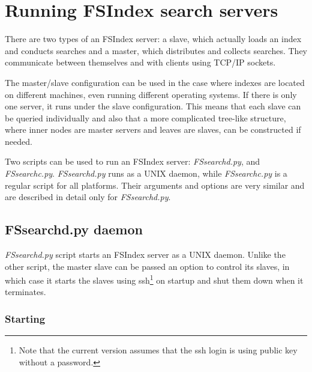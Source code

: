 \documentclass[10pt,letter]{article}
\begin{document}
\section{Running FSIndex search servers}

There are two types of an FSIndex server: a slave, which actually loads an index and conducts searches and a master, which distributes and collects searches. They communicate between themselves and with clients using TCP/IP sockets.

The master/slave configuration can be used in the case where indexes are located on different machines, even running different operating systems. If there is only one server, it runs under the slave configuration. This means that each slave can be queried individually and also that a more complicated tree-like structure, where inner nodes are master servers and leaves are slaves, can be constructed if needed.

Two scripts can be used to run an FSIndex server: \textit{FSsearchd.py}, and \textit{FSsearchc.py}. \textit{FSsearchd.py} runs as a UNIX daemon, while \textit{FSsearchc.py} is a regular script for all platforms. Their arguments and options are very similar and are described in detail only for \textit{FSsearchd.py}.

\subsection{FSsearchd.py daemon}\label{sec:FSdaemon}

\textit{FSsearchd.py} script starts an FSIndex server as a UNIX daemon. Unlike the other script, the master slave can be passed an option to control its slaves, in which case it starts the slaves using ssh\footnote{Note that the current version assumes that the ssh login is using public key without a password.} on startup and shut them down when it terminates.

\subsubsection{Starting}
\end{document}
